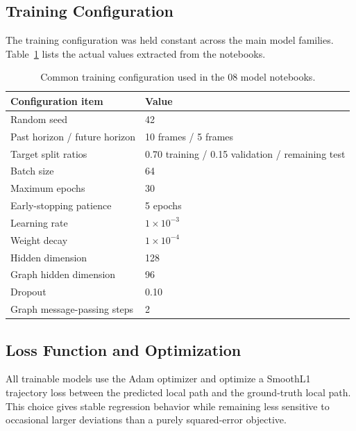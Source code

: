 \subsection{Training Configuration}

The training configuration was held constant across the main model families. Table~\ref{tab:training_config_summary} lists the actual values extracted from the notebooks.

\begin{table}[h]
    \caption{Common training configuration used in the 08 model notebooks.}
    \label{tab:training_config_summary}
    \centering
    \small
    \setlength{\tabcolsep}{4pt}
    \renewcommand{\arraystretch}{1.15}
    \begin{tabularx}{\textwidth}{@{}>{\raggedright\arraybackslash}p{}X@{}}
        \toprule
        \textbf{Configuration item} & \textbf{Value} \\
        \midrule
        Random seed & 42 \\
        Past horizon / future horizon & 10 frames / 5 frames \\
        Target split ratios & 0.70 training / 0.15 validation / remaining test \\
        Batch size & 64 \\
        Maximum epochs & 30 \\
        Early-stopping patience & 5 epochs \\
        Learning rate & $1 \times 10^{-3}$ \\
        Weight decay & $1 \times 10^{-4}$ \\
        Hidden dimension & 128 \\
        Graph hidden dimension & 96 \\
        Dropout & 0.10 \\
        Graph message-passing steps & 2 \\
        \bottomrule
    \end{tabularx}
\end{table}

\subsection{Loss Function and Optimization}

All trainable models use the Adam optimizer and optimize a SmoothL1 trajectory loss between the predicted local path and the ground-truth local path. This choice gives stable regression behavior while remaining less sensitive to occasional larger deviations than a purely squared-error objective.

